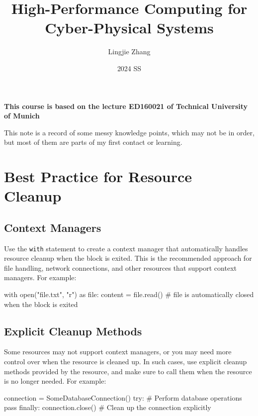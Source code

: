 \documentclass[12pt, a4paper, oneside, justified]{article}
\title{High-Performance Computing for Cyber-Physical Systems}
\author{Lingjie Zhang}
\date{2024 SS}
\begin{document}
\maketitle

\begin{center}
    \textbf{This course is based on the lecture ED160021 of Technical University of Munich}
\end{center}

This note is a record of some messy knowledge points, which may not be in order, but most of them are parts of my first contact or learning.

\tableofcontents
\newpage
{}


\section{Best Practice for Resource Cleanup}
\subsection{Context Managers}

Use the \texttt{with} statement to create a context manager that automatically
handles resource cleanup when the block is exited. This is the recommended approach for
file handling, network connections, and other resources that support context managers. For
example:

\begin{python}
    with open("file.txt", "r") as file:
        content = file.read()
    # file is automatically closed when the block is exited
\end{python}

\subsection{Explicit Cleanup Methods}

Some resources may not support context managers, or you may
need more control over when the resource is cleaned up. In such cases, use explicit cleanup
methods provided by the resource, and make sure to call them when the resource is no longer
needed. For example:

\begin{python}
    connection = SomeDatabaseConnection()
    try:
        # Perform database operations
        pass
    finally:
        connection.close()  # Clean up the connection explicitly
\end{python}
\end{document}
